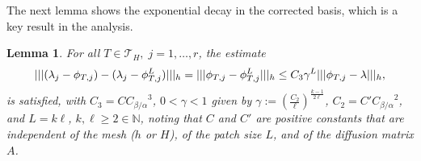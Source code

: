 \documentclass[10pt]{article}
\numberwithin{equation}{section}
\theoremstyle{plain}
\newtheorem{lemma}[theorem]{Lemma}
\theoremstyle{definition}
\theoremstyle{remark}
\begin{document}
The next lemma shows the exponential decay in the corrected basis, which is a key result in the analysis.
\begin{lemma}\label{lem:decay_layers}
   For all $T\in{\mathcal{T}}_H,\;j=1,\ldots,r$, the estimate
  \begin{equation}\notag
    {||| {(\lambda_j-\phi_{T,j})-(\lambda_j-\phi^L_{T,j})} |||_h} ={||| {\phi_{T,j}-\phi^L_{T,j}} |||_h} \leq  C_3\gamma^L{||| {\phi_{T,j}-\lambda} |||_h},
  \end{equation}
  is satisfied, with $C_3=C{C_{{\beta}/{\alpha}}}^3$, $0<\gamma<1$ given by $\gamma := (\frac{ C_2}{\ell})^{\frac{k-1}{2\ell}}$, $C_2=C'{C_{{\beta}/{\alpha}}}^2$, and $L = k\ell$, $k,\ell\geq2\in\mathbb{N}$, noting that $C$ and $C'$ are positive constants that are independent of the mesh ($h$ or $H$), of the patch size $L$, and of the diffusion matrix ${A}$.
\end{lemma} 
\end{document}
